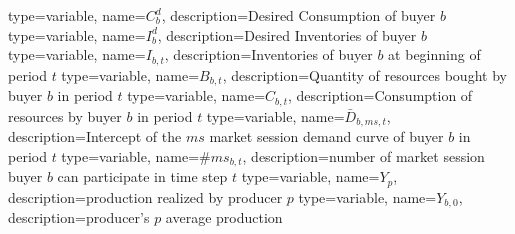 {%
  type=variable,%
  name={$C^d_b$},%
  description={Desired Consumption of buyer $b$} 
}
{%
  type=variable,%
  name={$I^d_b$},%
  description={Desired Inventories of buyer $b$} 
}
{%
  type=variable,%
  name={$I_{b,t}$},%
  description={Inventories of buyer $b$ at beginning of period $t$} 
}
{%
  type=variable,%
  name={$B_{b,t}$},%
  description={Quantity of resources bought by buyer $b$ in period $t$} 
}
{%
  type=variable,%
  name={$C_{b,t}$},%
  description={Consumption of resources by buyer $b$ in period $t$} 
}
{%
  type=variable,%
  name={$\bar{D}_{b,ms,t}$},%
  description={Intercept of the $ms$ market session demand curve of buyer $b$ in period $t$} 
}
{%
  type=variable,%
  name={$\#ms_{b,t}$},%
  description={number of market session buyer $b$ can participate in time step $t$} 
}
{%
  type=variable,%
  name={$Y_{p}$},%
  description={production realized by producer $p$} 
}
{%
  type=variable,%
  name={$Y_{b,0}$},%
  description={producer's $p$ average production} 
}


